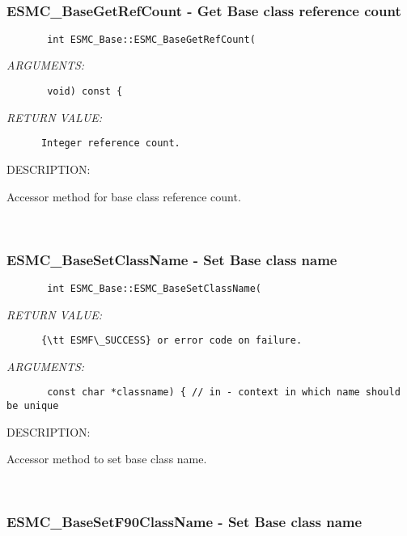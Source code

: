 \mbox{}\hrulefill\
 
\subsubsection [ESMC\_BaseGetRefCount] {ESMC\_BaseGetRefCount - Get Base class reference count}


  
\begin{verbatim}       int ESMC_Base::ESMC_BaseGetRefCount(\end{verbatim}{\em ARGUMENTS:}
\begin{verbatim}       void) const {\end{verbatim}{\em RETURN VALUE:}
\begin{verbatim}      Integer reference count.\end{verbatim}
{\sf DESCRIPTION:\\ }


      Accessor method for base class reference count.
   
 
\mbox{}\hrulefill\
 
\subsubsection [ESMC\_BaseSetClassName] {ESMC\_BaseSetClassName - Set Base class name}


  
\begin{verbatim}       int ESMC_Base::ESMC_BaseSetClassName(\end{verbatim}{\em RETURN VALUE:}
\begin{verbatim}      {\tt ESMF\_SUCCESS} or error code on failure.\end{verbatim}{\em ARGUMENTS:}
\begin{verbatim}       const char *classname) { // in - context in which name should be unique\end{verbatim}
{\sf DESCRIPTION:\\ }


      Accessor method to set base class name.
   
 
\mbox{}\hrulefill\
 
\subsubsection [ESMC\_BaseSetF90ClassName] {ESMC\_BaseSetF90ClassName - Set Base class name}


